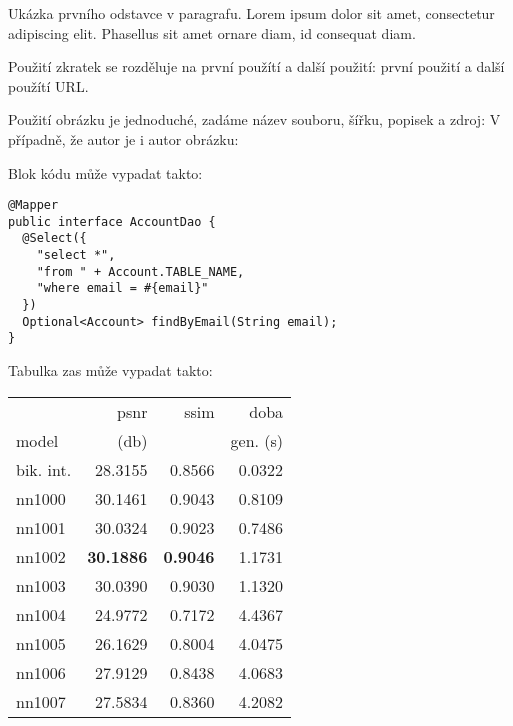 			\noindent Ukázka prvního odstavce v paragrafu. Lorem ipsum dolor sit amet, consectetur adipiscing elit. Phasellus sit amet ornare diam, id consequat diam.


			Použití zkratek se rozděluje na první použítí a další použití: první použití  a další použítí \ac{URL}.

			Použití obrázku je jednoduché, zadáme název souboru, šířku, popisek a zdroj:
			V případně, že autor je i autor obrázku:


			Blok kódu může vypadat takto:

			\begin{codeblock}
				\begin{verbatim}
@Mapper
public interface AccountDao {
  @Select({
    "select *",
    "from " + Account.TABLE_NAME,
    "where email = #{email}"
  })
  Optional<Account> findByEmail(String email);
}
				\end{verbatim}
			\end{codeblock}

			Tabulka zas může vypadat takto:

			\begin{table}[hbt!]
				\centering
				\begin{tabular}{| l | r | r | r | }
					\hline
					&        psnr &      ssim &      doba  \\
					model &       (db)    &           & gen. (s) \\
					\hline
					bik. int. & 28.3155 & 0.8566 & 0.0322 \\
					nn1000    & 30.1461 & 0.9043 & 0.8109 \\
					nn1001    & 30.0324 & 0.9023 & 0.7486 \\
					nn1002    & \textbf{30.1886} & \textbf{0.9046} & 1.1731 \\
					nn1003    & 30.0390 & 0.9030 & 1.1320 \\
					nn1004    & 24.9772 & 0.7172 & 4.4367 \\
					nn1005    & 26.1629 & 0.8004 & 4.0475 \\
					nn1006    & 27.9129 & 0.8438 & 4.0683 \\
					nn1007    & 27.5834 & 0.8360 & 4.2082 \\
					\hline
				\end{tabular}
			\end{table}

